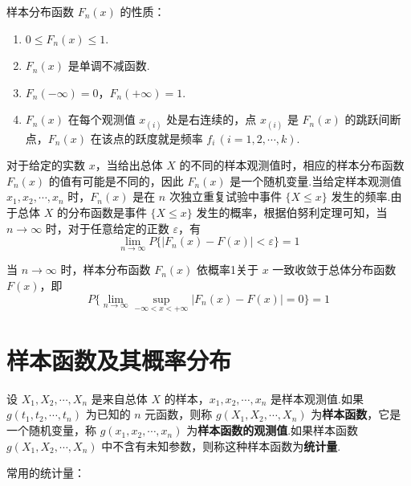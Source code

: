 样本分布函数 $F_n(x)$ 的性质：

\begin{enumerate}
    \item $0 \leqslant F_n(x) \leqslant 1$.
    \item $F_n(x)$ 是单调不减函数.
    \item $F_n(-\infty) = 0$，$F_n(+\infty) = 1$.
    \item $F_n(x)$ 在每个观测值 $x_{(i)}$ 处是右连续的，点 $x_{(i)}$ 是 $F_n(x)$ 的跳跃间断点，$F_n(x)$ 在该点的跃度就是频率 $f_i \, (i=1,2,\cdots,k)$.
\end{enumerate}

对于给定的实数 $x$，当给出总体 $X$ 的不同的样本观测值时，相应的样本分布函数 $F_n(x)$ 的值有可能是不同的，因此 $F_n(x)$ 是一个随机变量.当给定样本观测值 $x_1,x_2,\cdots,x_n$ 时，$F_n(x)$ 是在 $n$ 次独立重复试验中事件 $\{ X \leqslant x \}$ 发生的频率.由于总体 $X$ 的分布函数是事件 $\{ X \leqslant x \}$ 发生的概率，根据伯努利定理可知，当 $n \to \infty$ 时，对于任意给定的正数 $\varepsilon$，有
$$
\lim_{n \to \infty} P \{ |F_n(x) - F(x)| < \varepsilon \} = 1
$$

\begin{theorem}[（格利文科定理）]
    当 $n \to \infty$ 时，样本分布函数 $F_n(x)$ 依概率1关于 $x$ 一致收敛于总体分布函数 $F(x)$，即
    $$
    P \{ \lim_{n \to \infty} \sup_{-\infty < x < +\infty} |F_n(x) - F(x)| = 0 \} = 1
    $$
\end{theorem}

\section{样本函数及其概率分布}

\begin{definition}
    设 $X_1,X_2,\cdots,X_n$ 是来自总体 $X$ 的样本，$x_1,x_2,\cdots,x_n$ 是样本观测值.如果 $g(t_1,t_2,\cdots,t_n)$ 为已知的 $n$ 元函数，则称 $g(X_1,X_2,\cdots,X_n)$ 为\textbf{样本函数}，它是一个随机变量，称 $g(x_1,x_2,\cdots,x_n)$ 为\textbf{样本函数的观测值}.如果样本函数 $g(X_1,X_2,\cdots,X_n)$ 中不含有未知参数，则称这种样本函数为\textbf{统计量}.
\end{definition}

常用的统计量：

